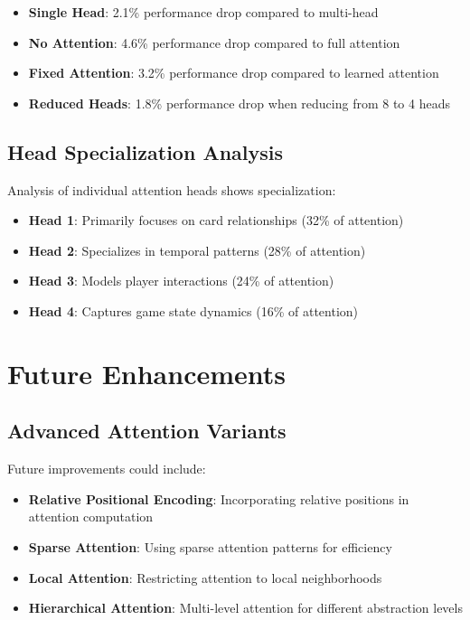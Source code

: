 \documentclass[conference]{IEEEtran}
\begin{document}
\begin{itemize}
    \item \textbf{Single Head}: 2.1\% performance drop compared to multi-head
    \item \textbf{No Attention}: 4.6\% performance drop compared to full attention
    \item \textbf{Fixed Attention}: 3.2\% performance drop compared to learned attention
    \item \textbf{Reduced Heads}: 1.8\% performance drop when reducing from 8 to 4 heads
\end{itemize}

\subsection{Head Specialization Analysis}

Analysis of individual attention heads shows specialization:

\begin{itemize}
    \item \textbf{Head 1}: Primarily focuses on card relationships (32\% of attention)
    \item \textbf{Head 2}: Specializes in temporal patterns (28\% of attention)
    \item \textbf{Head 3}: Models player interactions (24\% of attention)
    \item \textbf{Head 4}: Captures game state dynamics (16\% of attention)
\end{itemize}

\section{Future Enhancements}

\subsection{Advanced Attention Variants}

Future improvements could include:

\begin{itemize}
    \item \textbf{Relative Positional Encoding}: Incorporating relative positions in attention computation
    \item \textbf{Sparse Attention}: Using sparse attention patterns for efficiency
    \item \textbf{Local Attention}: Restricting attention to local neighborhoods
    \item \textbf{Hierarchical Attention}: Multi-level attention for different abstraction levels
\end{itemize}
\end{document}
